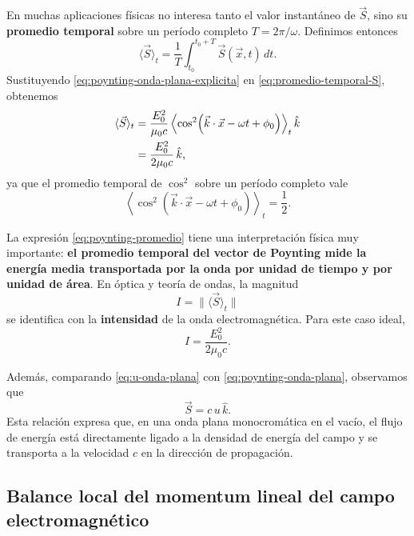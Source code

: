 \documentclass[12pt,a4paper]{article}
\theoremstyle{definition}
\theoremstyle{plain}
\numberwithin{equation}{section}
\theoremstyle{remark}
\begin{document}
En muchas aplicaciones físicas no interesa tanto el valor instantáneo de \(\vec S\), sino su \textbf{promedio temporal} sobre un período completo \(T=2\pi/\omega\). Definimos entonces
\begin{equation}
    \langle \vec S\rangle_t
    =
    \frac{1}{T}\int_{t_0}^{t_0+T}\vec S(\vec x,t)\,dt.
    \label{eq:promedio-temporal-S}
\end{equation}
Sustituyendo \eqref{eq:poynting-onda-plana-explicita} en \eqref{eq:promedio-temporal-S}, obtenemos
\begin{align}
    \langle \vec S\rangle_t
    &=
    \frac{E_0^2}{\mu_0 c}
    \left\langle
    \cos^2\!\left(\vec k\cdot\vec x-\omega t+\phi_0\right)
    \right\rangle_t
    \hat k \notag\\
    &=
    \frac{E_0^2}{2\mu_0 c}\,\hat k,
    \label{eq:poynting-promedio}
\end{align}
ya que el promedio temporal de \(\cos^2\) sobre un período completo vale
\begin{equation*}
    \left\langle
    \cos^2\!\left(\vec k\cdot\vec x-\omega t+\phi_0\right)
    \right\rangle_t
    =\frac{1}{2}.
\end{equation*}

La expresión \eqref{eq:poynting-promedio} tiene una interpretación física muy importante: \textbf{el promedio temporal del vector de Poynting mide la energía media transportada por la onda por unidad de tiempo y por unidad de área}. En óptica y teoría de ondas, la magnitud
\begin{equation*}
    I=\|\langle \vec S\rangle_t\|
\end{equation*}
se identifica con la \textbf{intensidad} de la onda electromagnética. Para este caso ideal,
\begin{equation*}
    I=\frac{E_0^2}{2\mu_0 c}.
\end{equation*}

Además, comparando \eqref{eq:u-onda-plana} con \eqref{eq:poynting-onda-plana}, observamos que
\begin{equation*}
    \vec S=c\,u\,\hat k.
\end{equation*}
Esta relación expresa que, en una onda plana monocromática en el vacío, el flujo de energía está directamente ligado a la densidad de energía del campo y se transporta a la velocidad \(c\) en la dirección de propagación.

\subsection{Balance local del momentum lineal del campo electromagnético}
\end{document}
